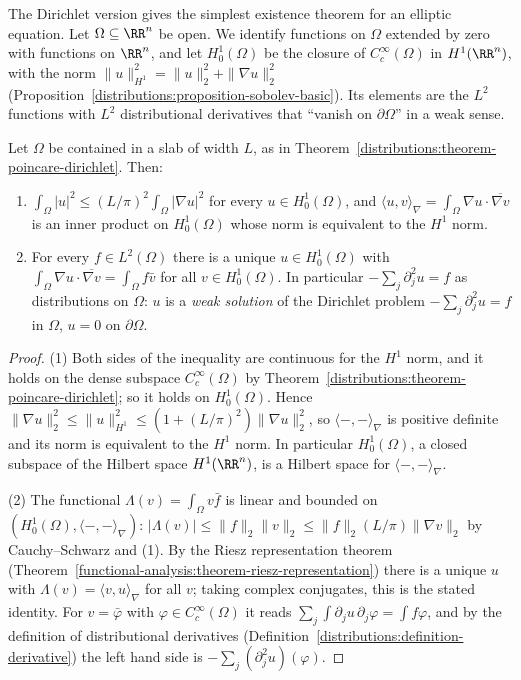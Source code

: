 The Dirichlet version gives the simplest existence theorem for an elliptic equation. Let $\Omega \subseteq \RR^n$ be open. We identify functions on $\Omega$ extended by zero with functions on
$\RR^n$, and let $H^1_0(\Omega)$ be the closure of $C^\infty_c(\Omega)$ in $H^1(\RR^n)$, with the norm $\|u\|_{H^1}^2 = \|u\|_2^2 + \|\nabla u\|_2^2$
(Proposition~\ref{distributions:proposition-sobolev-basic}). Its elements are the $L^2$ functions with $L^2$ distributional derivatives that ``vanish on $\partial\Omega$'' in a weak sense.

\begin{proposition}\label{distributions:proposition-dirichlet-weak}
Let $\Omega$ be contained in a slab of width $L$, as in Theorem~\ref{distributions:theorem-poincare-dirichlet}. Then:
\begin{enumerate}
\item $\int_\Omega|u|^2 \leq (L/\pi)^2\int_\Omega|\nabla u|^2$ for every $u \in H^1_0(\Omega)$, and $\langle u, v\rangle_\nabla = \int_\Omega\nabla u \cdot \overline{\nabla v}$ is an inner product on $H^1_0(\Omega)$ whose norm
is equivalent to the $H^1$ norm.
\item For every $f \in L^2(\Omega)$ there is a unique $u \in H^1_0(\Omega)$ with $\int_\Omega\nabla u \cdot \overline{\nabla v} = \int_\Omega f\bar v$ for all $v \in H^1_0(\Omega)$. In particular
$-\sum_j\partial_j^2u = f$ as distributions on $\Omega$: $u$ is a \emph{weak solution} of the Dirichlet problem $-\sum_j\partial_j^2u = f$ in $\Omega$, $u = 0$ on $\partial\Omega$.
\end{enumerate}
\end{proposition}

\begin{proof}
(1) Both sides of the inequality are continuous for the $H^1$ norm, and it holds on the dense subspace $C^\infty_c(\Omega)$ by Theorem~\ref{distributions:theorem-poincare-dirichlet}; so it holds on
$H^1_0(\Omega)$. Hence $\|\nabla u\|_2^2 \leq \|u\|_{H^1}^2 \leq (1 + (L/\pi)^2)\|\nabla u\|_2^2$, so $\langle -, - \rangle_\nabla$ is positive definite and its norm is equivalent to the $H^1$ norm. In
particular $H^1_0(\Omega)$, a closed subspace of the Hilbert space $H^1(\RR^n)$, is a Hilbert space for $\langle -, - \rangle_\nabla$.

(2) The functional $\Lambda(v) = \int_\Omega v\bar f$ is linear and bounded on $(H^1_0(\Omega), \langle -, - \rangle_\nabla)$: $|\Lambda(v)| \leq \|f\|_2\|v\|_2 \leq \|f\|_2(L/\pi)\|\nabla v\|_2$ by Cauchy--Schwarz
and (1). By the Riesz representation theorem (Theorem~\ref{functional-analysis:theorem-riesz-representation}) there is a unique $u$ with $\Lambda(v) = \langle v, u\rangle_\nabla$ for all $v$; taking complex
conjugates, this is the stated identity. For $v = \bar\varphi$ with $\varphi \in C^\infty_c(\Omega)$ it reads $\sum_j\int\partial_ju\,\partial_j\varphi = \int f\varphi$, and by the definition of distributional
derivatives (Definition~\ref{distributions:definition-derivative}) the left hand side is $-\sum_j(\partial_j^2u)(\varphi)$.
\end{proof}

